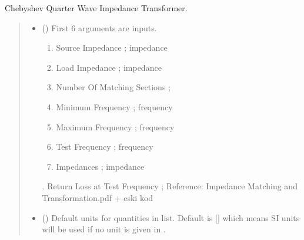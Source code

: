 \documentclass[letterpaper,10pt,english]{sphinxmanual}
\begin{document}

\begin{fulllineitems}
\label{\detokenize{components:components.Chebyshev_QWave_Impedance_Transformer}}
\pysigstartsignatures
{}
\pysigstopsignatures
\sphinxAtStartPar
Chebyshev Quarter Wave Impedance Transformer.
\begin{quote}\begin{description}
\begin{itemize}
\item {} 
\sphinxAtStartPar
{} () \textendash{} 
\sphinxAtStartPar
First 6 arguments are inputs.
\begin{enumerate}
%
\item {} 
\sphinxAtStartPar
Source Impedance ; impedance

\item {} 
\sphinxAtStartPar
Load Impedance ; impedance

\item {} 
\sphinxAtStartPar
Number Of Matching Sections ;

\item {} 
\sphinxAtStartPar
Minimum Frequency ; frequency

\item {} 
\sphinxAtStartPar
Maximum Frequency ; frequency

\item {} 
\sphinxAtStartPar
Test Frequency ; frequency

\item {} 
\sphinxAtStartPar
Impedances ; impedance

\end{enumerate}

.  Return Loss at Test Frequency ;
Reference:  Impedance Matching and Transformation.pdf + eski kod


\item {} 
\sphinxAtStartPar
{} (\sphinxstyleliteralemphasis{\sphinxupquote{, }}) \textendash{} Default units for quantities in  list. Default is {[}{]} which means SI units will be used if no unit is given in .


\end{itemize}
\end{description}
\end{quote}
\end{fulllineitems}
\end{document}
